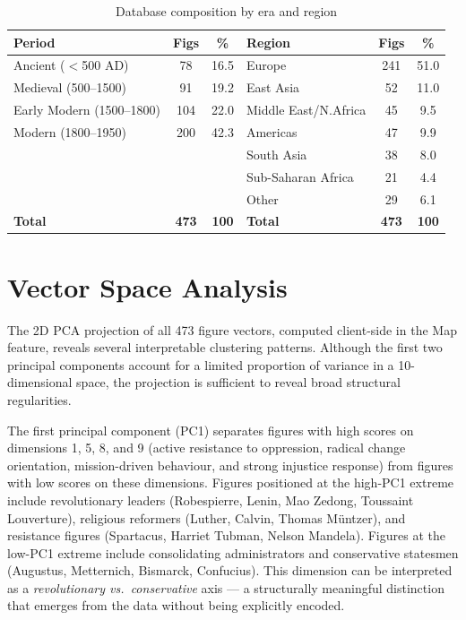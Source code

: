 \documentclass[11pt, a4paper]{report}
\begin{document}
\begin{table}[H]
  \centering
  \caption{Database composition by era and region}
  \label{tab:coverage2}
  \begin{tabular}{lcc|lcc}
    \toprule
    Period & Figs & \% & Region & Figs & \% \\
    \midrule
    Ancient ($<$500 AD) & 78 & 16.5 & Europe & 241 & 51.0 \\
    Medieval (500--1500) & 91 & 19.2 & East Asia & 52 & 11.0 \\
    Early Modern (1500--1800) & 104 & 22.0 & Middle East/N.Africa & 45 & 9.5 \\
    Modern (1800--1950) & 200 & 42.3 & Americas & 47 & 9.9 \\
    & & & South Asia & 38 & 8.0 \\
    & & & Sub-Saharan Africa & 21 & 4.4 \\
    & & & Other & 29 & 6.1 \\
    \midrule
    \textbf{Total} & \textbf{473} & \textbf{100} & \textbf{Total} & \textbf{473} & \textbf{100} \\
    \bottomrule
  \end{tabular}
\end{table}

\section{Vector Space Analysis}

The 2D PCA projection of all 473 figure vectors, computed client-side in the Map feature, reveals several interpretable clustering patterns. Although the first two principal components account for a limited proportion of variance in a 10-dimensional space, the projection is sufficient to reveal broad structural regularities.

The first principal component (PC1) separates figures with high scores on dimensions 1, 5, 8, and 9 (active resistance to oppression, radical change orientation, mission-driven behaviour, and strong injustice response) from figures with low scores on these dimensions. Figures positioned at the high-PC1 extreme include revolutionary leaders (Robespierre, Lenin, Mao Zedong, Toussaint Louverture), religious reformers (Luther, Calvin, Thomas M\"{u}ntzer), and resistance figures (Spartacus, Harriet Tubman, Nelson Mandela). Figures at the low-PC1 extreme include consolidating administrators and conservative statesmen (Augustus, Metternich, Bismarck, Confucius). This dimension can be interpreted as a \textit{revolutionary vs.\ conservative} axis — a structurally meaningful distinction that emerges from the data without being explicitly encoded.
\end{document}
